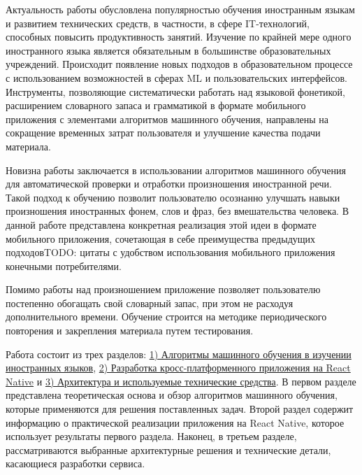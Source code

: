 Актуальность работы обусловлена популярностью обучения иностранным языкам и развитием технических средств, в частности, в сфере IT-технологий, способных повысить продуктивность занятий. Изучение по крайней мере одного иностранного языка является обязательным в большинстве образовательных учреждений. Происходит появление новых подходов в образовательном процессе с использованием возможностей в сферах ML и пользовательских интерфейсов. Инструменты, позволяющие систематически работать над языковой фонетикой, расширением словарного запаса и грамматикой в формате мобильного приложения с элементами алгоритмов машинного обучения, направлены на сокращение временных затрат пользователя и улучшение качества подачи материала.

Новизна работы заключается в использовании алгоритмов машинного обучения для автоматической проверки и отработки произношения иностранной речи. Такой подход к обучению позволит пользователю осознанно улучшать навыки произношения иностранных фонем, слов и фраз, без вмешательства человека. В данной работе представлена конкретная реализация этой идеи в формате мобильного приложения, сочетающая в себе преимущества предыдущих подходов{\color{red}TODO: цитаты} с удобством использования мобильного приложения конечными потребителями.

Помимо работы над произношением приложение позволяет пользователю постепенно обогащать свой словарный запас, при этом не расходуя дополнительного времени. Обучение строится на методике периодического повторения и закрепления материала путем тестирования.

Работа состоит из трех разделов: \hyperref[sec:section-1]{1) Алгоритмы машинного обучения в изучении иностранных языков}, \hyperref[sec:section-2]{2) Разработка кросс-платформенного приложения на React Native} и \hyperref[sec:section-3]{3) Архитектура и используемые технические средства}. В первом разделе представлена теоретическая основа и обзор алгоритмов машинного обучения, которые применяются для решения поставленных задач. Второй раздел содержит информацию о практической реализации приложения на React Native, которое использует результаты первого раздела. Наконец, в третьем разделе, рассматриваются выбранные архитектурные решения и технические детали, касающиеся разработки сервиса.

